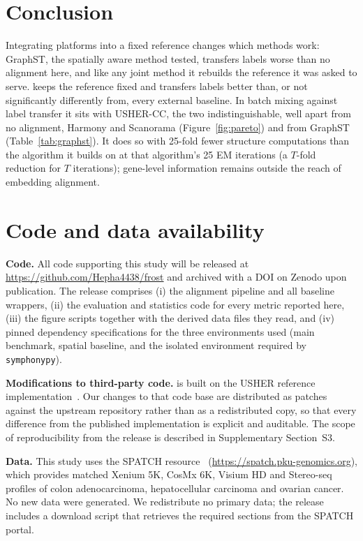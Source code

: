 \section{Conclusion}\label{sec:conclusion}
Integrating platforms into a fixed reference changes which methods work: GraphST, the spatially aware method tested,
transfers labels worse than no alignment here, and like any joint method it rebuilds the reference it was asked to
serve. \frost keeps the reference
fixed and transfers labels better than, or not significantly differently from, every external baseline. In batch
mixing against label transfer it sits with USHER-CC, the two indistinguishable, well apart from no alignment,
Harmony and Scanorama (Figure~\ref{fig:pareto}) and from GraphST (Table~\ref{tab:graphst}). It does so with 25-fold fewer
structure computations than the algorithm it builds on at that algorithm's 25 EM iterations (a $T$-fold reduction
for $T$ iterations); gene-level information remains outside the reach of
embedding alignment.

\section*{Code and data availability}

\noindent\textbf{Code.} All code supporting this study will be released at
\url{https://github.com/Hepha4438/frost} and archived with a DOI on Zenodo upon publication.
The release comprises (i) the alignment pipeline and all baseline wrappers, (ii) the
evaluation and statistics code for every metric reported here, (iii) the figure scripts
together with the derived data files they read, and (iv) pinned dependency specifications
for the three environments used (main benchmark, spatial baseline, and the isolated
environment required by \texttt{symphonypy}).

\noindent\textbf{Modifications to third-party code.} \frost is built on the USHER reference
implementation~\citep{pratapa2025usher}. Our changes to that code base are distributed as patches
against the upstream repository rather than as a redistributed copy, so that every
difference from the published implementation is explicit and auditable. The scope of reproducibility from the
release is described in Supplementary Section~S3.

\noindent\textbf{Data.} This study uses the SPATCH resource~\citep{ren2025spatch}
(\url{https://spatch.pku-genomics.org}), which provides matched Xenium 5K, CosMx 6K,
Visium HD and Stereo-seq profiles of colon adenocarcinoma, hepatocellular carcinoma and
ovarian cancer. No new data were generated. We redistribute no primary data; the release
includes a download script that retrieves the required sections from the SPATCH portal.
